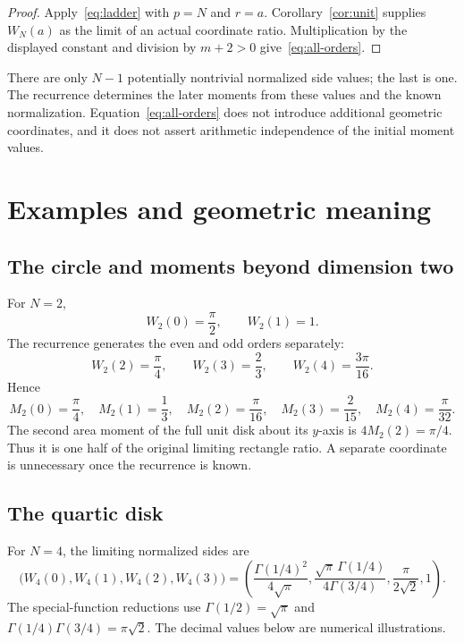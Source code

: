 \documentclass[11pt]{article}
\numberwithin{equation}{section}
\theoremstyle{remark}
\begin{document}
\begin{proof}
Apply~\eqref{eq:ladder} with $p=N$ and $r=a$.
Corollary~\ref{cor:unit} supplies $W_N(a)$ as the limit of an
actual coordinate ratio. Multiplication by the displayed constant
and division by $m+2>0$ give~\eqref{eq:all-orders}.
\end{proof}

There are only $N-1$ potentially nontrivial normalized side values;
the last is one. The recurrence determines the later moments from
these values and the known normalization. Equation~\eqref{eq:all-orders}
does not introduce additional geometric coordinates, and it does not
assert arithmetic independence of the initial moment values.

\section{Examples and geometric meaning}
\label{sec:examples}

\subsection{The circle and moments beyond dimension two}

For $N=2$,
\[
  W_2(0)=\frac{\pi}{2},\qquad W_2(1)=1.
\]
The recurrence generates the even and odd orders separately:
\[
  W_2(2)=\frac{\pi}{4},\qquad
  W_2(3)=\frac23,\qquad
  W_2(4)=\frac{3\pi}{16}.
\]
Hence
\[
  M_2(0)=\frac{\pi}{4},\quad M_2(1)=\frac13,\quad
  M_2(2)=\frac{\pi}{16},\quad M_2(3)=\frac{2}{15},\quad
  M_2(4)=\frac{\pi}{32}.
\]
The second area moment of the full unit disk about its $y$-axis
is $4M_2(2)=\pi/4$. Thus it is one half of the original
limiting rectangle ratio. A separate coordinate is unnecessary
once the recurrence is known.

\subsection{The quartic disk}

For $N=4$, the limiting normalized sides are
\begin{equation}
  \bigl(W_4(0),W_4(1),W_4(2),W_4(3)\bigr)
  =
  \left(
    \frac{\Gamma(1/4)^2}{4\sqrt{\pi}},
    \frac{\sqrt{\pi}\,\Gamma(1/4)}{4\Gamma(3/4)},
    \frac{\pi}{2\sqrt{2}},
    1
  \right).
  \label{eq:quartic}
\end{equation}
The special-function reductions use
$\Gamma(1/2)=\sqrt{\pi}$ and
$\Gamma(1/4)\Gamma(3/4)=\pi\sqrt{2}$.
The decimal values below are numerical illustrations.
\end{document}
